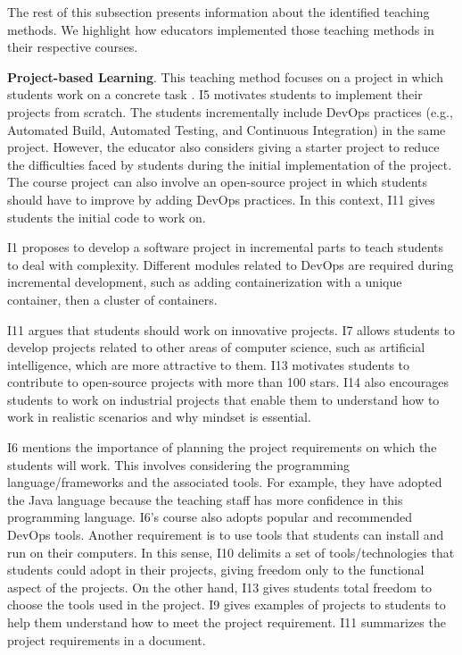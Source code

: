 \documentclass[10pt,conference]{IEEEtran}
\begin{document}
The rest of this subsection presents information about the identified teaching methods. We highlight how educators implemented those teaching methods in their respective courses.

{{\textbf{Project-based Learning}.}} This teaching method focuses on a project in which students work on a concrete task \cite{indiramma:2014}. I5 motivates students to implement their projects from scratch. The students incrementally include DevOps practices (e.g., Automated Build, Automated Testing, and Continuous Integration) in the same project. However, the educator also considers giving a starter project to reduce the difficulties faced by students during the initial implementation of the project. The course project can also involve an open-source project in which students should have to improve by adding DevOps practices. In this context, I11 gives students the initial code to work on.

I1 proposes to develop a software project in incremental parts to teach students to deal with complexity. Different modules related to DevOps are required during incremental development, such as adding containerization with a unique container, then a cluster of containers.

I11 argues that students should work on innovative projects. I7 allows students to develop projects related to other areas of computer science, such as artificial intelligence, which are more attractive to them. I13 motivates students to contribute to open-source projects with more than 100 stars. I14 also encourages students to work on industrial projects that enable them to understand how to work in realistic scenarios and why mindset is essential.

I6 mentions the importance of planning the project requirements on which the students will work. This involves considering the programming language/frameworks and the associated tools. For example, they have adopted the Java language because the teaching staff has more confidence in this programming language. I6's course also adopts popular and recommended DevOps tools. Another requirement is to use tools that students can install and run on their computers. In this sense, I10 delimits a set of tools/technologies that students could adopt in their projects, giving freedom only to the functional aspect of the projects. On the other hand, I13 gives students total freedom to choose the tools used in the project. I9 gives examples of projects to students to help them understand how to meet the project requirement. I11 summarizes the project requirements in a document.
\end{document}
